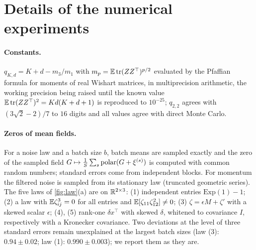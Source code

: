 \section{Details of the numerical experiments}\label{app:exp}

\paragraph{Constants.} $q_{K,d}=K+d-m_3/m_1$ with $m_p=\mathbb{E}\operatorname{tr}(ZZ^\top)^{p/2}$ evaluated by the Pfaffian formula for
moments of real Wishart matrices, in multiprecision arithmetic, the working precision being raised until the known
value $\mathbb{E}\operatorname{tr}(ZZ^\top)^2=Kd(K+d+1)$ is reproduced to $10^{-25}$; $q_{2,2}$ agrees with $(3\sqrt2-2)/7$ to $16$ digits and
all values agree with direct Monte Carlo.

\paragraph{Zeros of mean fields.} For a noise law and a batch size $b$, batch means are sampled exactly and the zero of
the sampled field $G\mapsto\frac1S\sum_s\operatorname{polar}(G+\xi^{(s)})$ is computed with common random numbers; standard errors
come from independent blocks. For momentum the filtered noise is sampled from its stationary law (truncated
geometric series). The five laws of \cref{fig:law}(a) are on $\mathbb{R}^{2\times3}$: (1) independent entries
$\mathrm{Exp}(1)-1$; (2) a law with $\mathbb{E}\zeta_{ij}^3=0$ for all entries and $\mathbb{E}[\zeta_{11}\zeta_{12}^2]\ne0$; (3)
$\zeta=\epsilon M+\zeta'$ with a skewed scalar $\epsilon$; (4), (5) rank-one $\delta x^\top$ with skewed $\delta$,
whitened to covariance $I$, respectively with a Kronecker covariance. Two deviations at the level of three standard
errors remain unexplained at the largest batch sizes (law (3): $0.94\pm0.02$; law (1): $0.990\pm0.003$); we
report them as they are.

